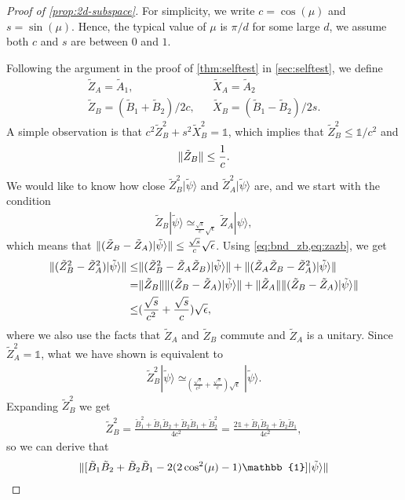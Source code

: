 \documentclass[11pt,letterpaper]{article}
\newcommand{\ket}[1]{|#1\rangle}
\DeclarePairedDelimiter{\norm}{\lVert}{\rVert}
\newcommand{\1}{\mathbb{1}}
\newcommand{\tA}{\tilde{A}}
\newcommand{\tB}{\tilde{B}}
\newcommand{\tZ}{\tilde{Z}}
\newcommand{\tX}{\tilde{X}}
\newcommand{\tpsi}{\tilde{\psi}}
\newcommand{\appd}[1]{\simeq_{#1}}
\theoremstyle{definition}
\begin{document}
\begin{proof}[Proof of \cref{prop:2d-subspace}]
	For simplicity, we write $c = \cos(\mu)$ and $s = \sin(\mu)$.
	Hence, the typical value of $\mu$ is $\pi/d$ for some large $d$, we assume both $c$ and $s$ are between $0$ and $1$.
	
	Following the argument in the proof of \cref{thm:selftest} in \cref{sec:selftest}, we define
	\begin{align*}	
	\tilde{Z}_A = \tA_1, && \tX_A = \tA_2\\
	\tilde{Z}_B = (\tB_1+\tB_2)/2c, && \tX_B = (\tB_1-\tB_2)/2s.
	\end{align*}
	A simple observation is that $c^2 \tZ_B^2 + s^2 \tX_B^2 = \1$, which implies that 
	$ \tZ_B^2 \leq \1/c^2$ and 
	\begin{align}
		\label{eq:bnd_zb}
		\norm{\tZ_B} \leq \frac{1}{c}.
	\end{align}
	We would like to know how close $\tZ_B^2\ket{\tpsi}$ and $\tZ_A^2\ket{\tpsi}$ are,
	and we start with the condition 
	\begin{align}
		\label{eq:zazb}
		\tZ_B \ket{\tpsi} \appd{\frac{\sqrt{s}}{c}\sqrt{\epsilon}} \tZ_A \ket{\psi},
	\end{align}
	which means that $\norm{ (\tZ_B-\tZ_A)\ket{\tpsi}} \leq \frac{\sqrt{s}}{c}\sqrt{\epsilon}$.
	Using \cref{eq:bnd_zb,eq:zazb}, we get
	\begin{align}
		\norm{ (\tZ_B^2 - \tZ_A^2)\ket{\tpsi}} \leq& \norm{ (\tZ_B^2 - \tZ_A\tZ_B)\ket{\tpsi}} + \norm{ (\tZ_A\tZ_B - \tZ_A^2)\ket{\tpsi}}\\
		=&\norm{\tZ_B}\norm{ (\tZ_B - \tZ_A)\ket{\tpsi}} + \norm{\tZ_A}\norm{ (\tZ_B - \tZ_A)\ket{\tpsi}}\\
		\leq&(\frac{\sqrt{s}}{c^2}+ \frac{\sqrt{s}}{c})\sqrt{\epsilon},
	\end{align}
	where we also use the facts that $\tZ_A$ and $\tZ_B$ commute and $\tZ_A$ is a unitary.
	Since $\tZ_A^2 = \1$, what we have shown is equivalent to 
	\begin{align}
		\tZ_B^2 \ket{\tpsi} \appd{(\frac{\sqrt{s}}{c^2}+ \frac{\sqrt{s}}{c})\sqrt{\epsilon}} \ket{\tpsi}.
	\end{align}
	Expanding $\tilde{Z}_B^2$ we get
	\begin{align*}
		 \tilde{Z}_B^2 = \frac{\tB_1^2 + \tB_1\tB_2 + \tB_2\tB_1 + \tB_2^2}{4c^2}
		=\frac{2\1 + \tB_1\tB_2 + \tB_2\tB_1}{4c^2},
	\end{align*}
	so we can derive that 
	\begin{align*}
		&\norm{[\tB_1\tB_2 + \tB_2\tB_1 - 2(2\cos^2(\mu)-1)\1]\ket{\tpsi}} \\

\end{align*}
\end{proof}
\end{document}
